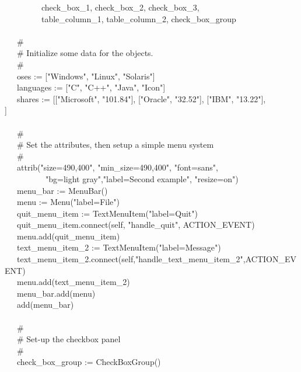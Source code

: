 {\>   \ \ \ \ \ \ \ \ \ check\_box\_1, check\_box\_2, check\_box\_3, \\
\>   \ \ \ \ \ \ \ \ \ table\_column\_1, table\_column\_2, check\_box\_group \\
\ \\
\>   \ \ \ \# \\
\>   \ \ \ \# Initialize some data for the objects. \\
\>   \ \ \ \# \\
\>   \ \ \ oses := ["Windows",
"Linux",
"Solaris"] \\
\>   \ \ \ languages := ["C",
"C++", "Java",
"Icon"] \\
\>   \ \ \ shares := [["Microsoft",
"101.84"],
["Oracle",
"32.52"],
["IBM",
"13.22"], \\
\>\>\>
["Intel",
"142.00"]] \\
\ \\
\>   \ \ \ \# \\
\>   \ \ \ \# Set the attributes, then setup a simple menu system \\
\>   \ \ \ \# \\
\>   \ \ \ attrib("size=490,400",
"min\_size=490,400",
"font=sans", \\
\>   \ \ \ \ \ \ \ \ \ \ "bg=light
gray","label=Second example",
"resize=on") \\
\>   \ \ \ menu\_bar := MenuBar() \\
\>   \ \ \ menu := Menu("label=File") \\
\>   \ \ \ quit\_menu\_item := TextMenuItem("label=Quit") \\
\>   \ \ \ quit\_menu\_item.connect(self, "handle\_quit", ACTION\_EVENT) \\
\>   \ \ \ menu.add(quit\_menu\_item) \\
\>   \ \ \ text\_menu\_item\_2 :=
TextMenuItem("label=Message") \\
\>   \ \ \ text\_menu\_item\_2.connect(self,"handle\_text\_menu\_item\_2",ACTION\_EVENT) \\
\>   \ \ \ menu.add(text\_menu\_item\_2) \\
\>   \ \ \ menu\_bar.add(menu) \\
\>   \ \ \ add(menu\_bar) \\
\ \\
\>   \ \ \ \# \\
\>   \ \ \ \# Set-up the checkbox panel \\
\>   \ \ \ \# \\
\>   \ \ \ check\_box\_group := CheckBoxGroup() \\
}
